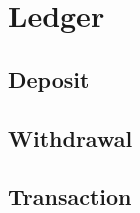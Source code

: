 \documentclass[../hydrozoa.tex]{subfiles}
\begin{document}
\section{Ledger}%
\label{h:offchain-ledger}


\subsection{Deposit}%
\label{h:ledger-deposit}

\subsection{Withdrawal}%
\label{h:ledger-withdrawal}

\subsection{Transaction}%
\label{h:ledger-transaction}
\end{document}
